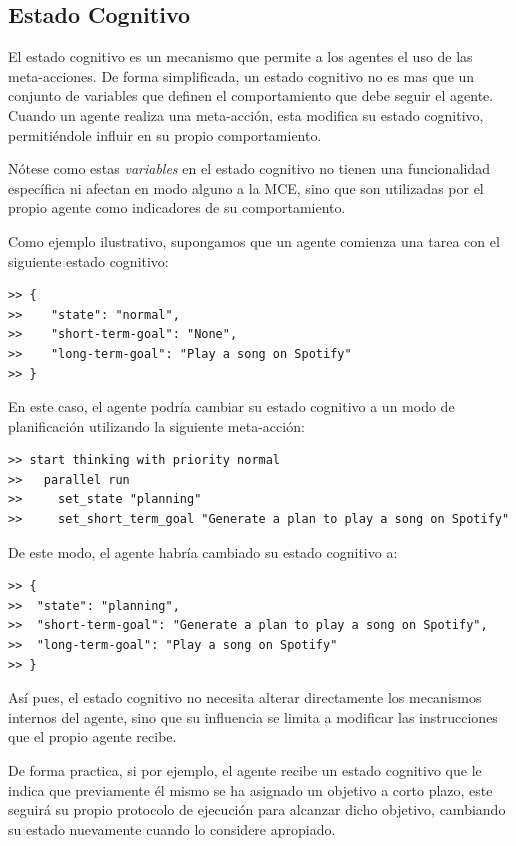 \subsection{Estado Cognitivo}
El estado cognitivo es un mecanismo que permite a los agentes el uso de 
las meta-acciones. De forma simplificada, un estado cognitivo no es mas que
un conjunto de variables que definen el comportamiento que debe seguir
el agente. Cuando un agente realiza una meta-acción, esta modifica su estado cognitivo, permitiéndole
influir en su propio comportamiento. 

Nótese como estas \emph{variables} en el estado cognitivo no tienen una funcionalidad específica
ni afectan en modo alguno a la MCE, sino que son utilizadas por el propio agente como indicadores 
de su comportamiento.

Como ejemplo ilustrativo, supongamos que un agente comienza una tarea 
con el siguiente estado cognitivo:

\begin{lstlisting}[caption={Ejemplo de estado cognitivo inicial}, label={cod:cognitive_state_initial_example}]
>> {
>>    "state": "normal",
>>    "short-term-goal": "None",
>>    "long-term-goal": "Play a song on Spotify"
>> }
\end{lstlisting}

En este caso, el agente podría cambiar su estado cognitivo a un modo de planificación
utilizando la siguiente meta-acción:
\begin{lstlisting}[caption={Cambio de estado cognitivo}, label={cod:cognitive_state_change_example}]
>> start thinking with priority normal
>>   parallel run
>>     set_state "planning"
>>     set_short_term_goal "Generate a plan to play a song on Spotify"
\end{lstlisting}

De este modo, el agente habría cambiado su estado cognitivo a:
\begin{lstlisting}[caption={Estado cognitivo actualizado}, label={cod:cognitive_state_updated_example}]
>> {
>>  "state": "planning",
>>  "short-term-goal": "Generate a plan to play a song on Spotify",
>>  "long-term-goal": "Play a song on Spotify"
>> }
\end{lstlisting}

Así pues, el estado cognitivo no necesita alterar directamente los mecanismos internos 
del agente, sino que su influencia se limita a modificar las instrucciones que el propio agente recibe.

De forma practica, si por ejemplo, el agente recibe un estado cognitivo que le indica que previamente
él mismo se ha asignado un objetivo a corto plazo, este seguirá su propio protocolo de ejecución
para alcanzar dicho objetivo, cambiando su estado nuevamente cuando lo considere apropiado.


